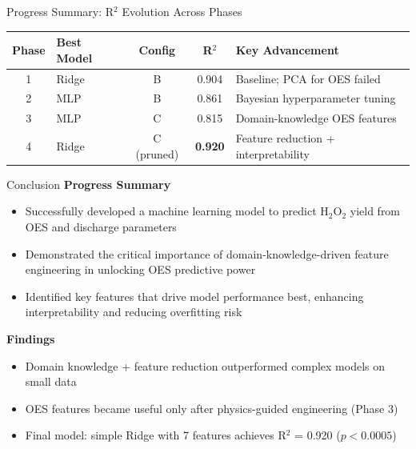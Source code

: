 \documentclass{libs/XJTLU_format}
\begin{document}
\begin{frame}{Progress Summary: R$^2$ Evolution Across Phases}
    \begin{table}[h]
        \centering
        \begin{tabular}{@{}clccp{4.5cm}@{}}
            \toprule
            \textbf{Phase} & \textbf{Best Model} & \textbf{Config} & \textbf{R$^2$} & \textbf{Key Advancement} \\
            \midrule
            1 & Ridge & B & 0.904 & Baseline; PCA for OES failed \\
            2 & MLP   & B & 0.861 & Bayesian hyperparameter tuning \\
            3 & MLP   & C & 0.815 & Domain-knowledge OES features \\
            4 & Ridge & C (pruned) & \textbf{0.920} & Feature reduction + interpretability \\
            \bottomrule
        \end{tabular}
    \end{table}
    \vspace{0.5em}

\end{frame}

\begin{frame}{Conclusion}
    \textbf{Progress Summary}
    \begin{itemize}
        \item Successfully developed a machine learning model to predict H$_2$O$_2$ yield from OES and discharge parameters 
        \item Demonstrated the critical importance of domain-knowledge-driven feature engineering in unlocking OES predictive power
        \item Identified key features that drive model performance best, enhancing interpretability and reducing overfitting risk
    \end{itemize}

    \textbf{Findings}
    \begin{itemize}
        \item Domain knowledge + feature reduction outperformed complex models on small data
        \item OES features became useful only after physics-guided engineering (Phase 3)
        \item Final model: simple Ridge with 7 features achieves R$^2$ = 0.920 ($p < 0.0005$)
    \end{itemize}
\end{frame}
\end{document}
